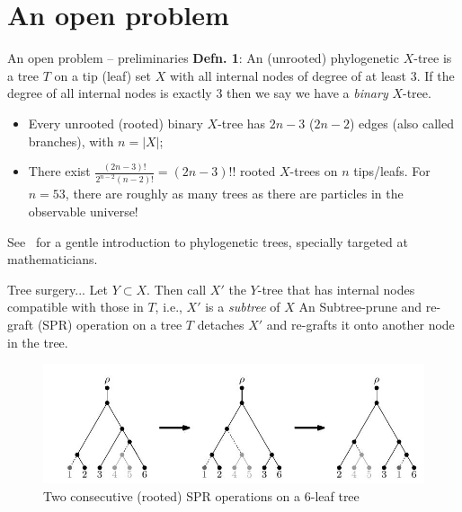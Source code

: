\section*{An open problem}
\begin{frame}{An open problem -- preliminaries}
\textbf{Defn. 1}: An (unrooted) phylogenetic $X$-tree is a tree $T$ on a tip (leaf) set $X$ with all internal nodes of degree of at least $3$.
If the degree of all internal nodes is exactly $3$ then we say we have a \textit{binary} $X$-tree. 
\begin{itemize}
 \item Every unrooted (rooted) binary $X$-tree has $2n - 3$ ($2n - 2$) edges (also called branches), with $n = |X|$;
 \item There exist $\frac{(2n-3)!}{2^{n-2}(n-2)!} = (2n-3)!!$ rooted $X$-trees on $n$ tips/leafs.
For $n = 53$, there are roughly as many trees as there are particles in the observable universe!
\end{itemize}
See~\cite{steel2014} for a gentle introduction to phylogenetic trees, specially targeted at mathematicians.
\end{frame}
\begin{frame}{Tree surgery...}
Let $Y \subset X$. Then call $X'$ the $Y$-tree that has internal nodes compatible with those in $T$, i.e., $X'$ is a \textit{subtree} of $X$
An Subtree-prune and re-graft (SPR) operation on a tree $T$ detaches $X'$ and re-grafts it onto another node in the tree.
\begin{center}
 \begin{figure}
  \includegraphics[scale=0.5]{FIGURES/two_sprs.jpg}
  \caption{Two consecutive (rooted) SPR operations on a 6-leaf tree~\citep{whidden2015}}
 \end{figure}
\end{center}
\end{frame}
